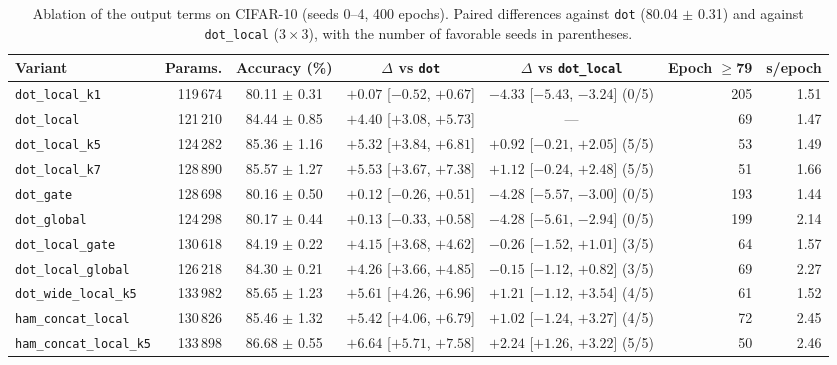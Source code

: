 
\begin{table}[!t]
\centering
\footnotesize
\caption{Ablation of the output terms on CIFAR-10 (seeds 0--4, 400 epochs). Paired differences against \texttt{dot} (80.04 $\pm$ 0.31) and against \texttt{dot\_local} ($3\times3$), with the number of favorable seeds in parentheses.}
\label{tab:ablacion}
\begin{adjustbox}{max width=\linewidth}
\begin{tabular}{lrcccrr}
\toprule
Variant & Params. & Accuracy (\%) & $\Delta$ vs \texttt{dot} & $\Delta$ vs \texttt{dot\_local} & Epoch $\geq$79 & s/epoch \\
\midrule
\texttt{dot\_local\_k1} & 119\,674 & 80.11 $\pm$ 0.31 & $+0.07$ [$-0.52$, $+0.67$] & $-4.33$ [$-5.43$, $-3.24$] (0/5) & 205 & 1.51 \\
\texttt{dot\_local} & 121\,210 & 84.44 $\pm$ 0.85 & $+4.40$ [$+3.08$, $+5.73$] & --- & 69 & 1.47 \\
\texttt{dot\_local\_k5} & 124\,282 & 85.36 $\pm$ 1.16 & $+5.32$ [$+3.84$, $+6.81$] & $+0.92$ [$-0.21$, $+2.05$] (5/5) & 53 & 1.49 \\
\texttt{dot\_local\_k7} & 128\,890 & 85.57 $\pm$ 1.27 & $+5.53$ [$+3.67$, $+7.38$] & $+1.12$ [$-0.24$, $+2.48$] (5/5) & 51 & 1.66 \\
\texttt{dot\_gate} & 128\,698 & 80.16 $\pm$ 0.50 & $+0.12$ [$-0.26$, $+0.51$] & $-4.28$ [$-5.57$, $-3.00$] (0/5) & 193 & 1.44 \\
\texttt{dot\_global} & 124\,298 & 80.17 $\pm$ 0.44 & $+0.13$ [$-0.33$, $+0.58$] & $-4.28$ [$-5.61$, $-2.94$] (0/5) & 199 & 2.14 \\
\texttt{dot\_local\_gate} & 130\,618 & 84.19 $\pm$ 0.22 & $+4.15$ [$+3.68$, $+4.62$] & $-0.26$ [$-1.52$, $+1.01$] (3/5) & 64 & 1.57 \\
\texttt{dot\_local\_global} & 126\,218 & 84.30 $\pm$ 0.21 & $+4.26$ [$+3.66$, $+4.85$] & $-0.15$ [$-1.12$, $+0.82$] (3/5) & 69 & 2.27 \\
\texttt{dot\_wide\_local\_k5} & 133\,982 & 85.65 $\pm$ 1.23 & $+5.61$ [$+4.26$, $+6.96$] & $+1.21$ [$-1.12$, $+3.54$] (4/5) & 61 & 1.52 \\
\texttt{ham\_concat\_local} & 130\,826 & 85.46 $\pm$ 1.32 & $+5.42$ [$+4.06$, $+6.79$] & $+1.02$ [$-1.24$, $+3.27$] (4/5) & 72 & 2.45 \\
\texttt{ham\_concat\_local\_k5} & 133\,898 & 86.68 $\pm$ 0.55 & $+6.64$ [$+5.71$, $+7.58$] & $+2.24$ [$+1.26$, $+3.22$] (5/5) & 50 & 2.46 \\
\bottomrule
\end{tabular}
\end{adjustbox}
\end{table}
